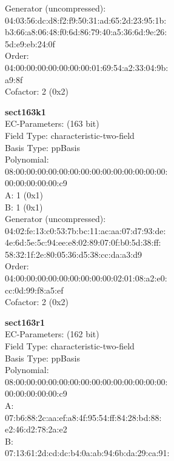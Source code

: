 Generator (uncompressed):\\
    04:03:56:dc:d8:f2:f9:50:31:ad:65:2d:23:95:1b:\\
    b3:66:a8:06:48:f0:6d:86:79:40:a5:36:6d:9e:26:\\
    5d:e9:eb:24:0f\\
Order: \\
    04:00:00:00:00:00:00:00:01:69:54:a2:33:04:9b:\\
    a9:8f\\
Cofactor:  2 (0x2)\\
\item \textbf{ sect163k1 }\\
EC-Parameters: (163 bit)\\
Field Type: characteristic-two-field\\
Basis Type: ppBasis\\
Polynomial:\\
    08:00:00:00:00:00:00:00:00:00:00:00:00:00:00:\\
    00:00:00:00:00:c9\\
A:    1 (0x1)\\
B:    1 (0x1)\\
Generator (uncompressed):\\
    04:02:fe:13:c0:53:7b:bc:11:ac:aa:07:d7:93:de:\\
    4e:6d:5e:5c:94:ee:e8:02:89:07:0f:b0:5d:38:ff:\\
    58:32:1f:2e:80:05:36:d5:38:cc:da:a3:d9\\
Order: \\
    04:00:00:00:00:00:00:00:00:00:02:01:08:a2:e0:\\
    cc:0d:99:f8:a5:ef\\
Cofactor:  2 (0x2)\\
\item \textbf{ sect163r1 }\\
EC-Parameters: (162 bit)\\
Field Type: characteristic-two-field\\
Basis Type: ppBasis\\
Polynomial:\\
    08:00:00:00:00:00:00:00:00:00:00:00:00:00:00:\\
    00:00:00:00:00:c9\\
A:   \\
    07:b6:88:2c:aa:ef:a8:4f:95:54:ff:84:28:bd:88:\\
    e2:46:d2:78:2a:e2\\
B:   \\
    07:13:61:2d:cd:dc:b4:0a:ab:94:6b:da:29:ca:91:\\
